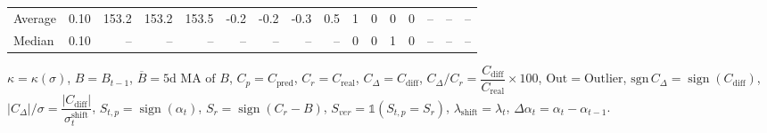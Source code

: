\begin{threeparttable}
{\begin{tabular}{lrrrrrrrrrrrrrrr}
Average &     0.10 & 153.2 & 153.2 & 153.5 &       -0.2 &           -0.2 &                     -0.3 &                 0.5 &              1 &         0 &     0 &         0 &         -- &        -- &             -- \\
 Median &     0.10 &    -- &    -- &    -- &         -- &             -- &                       -- &                  -- &              0 &         0 &     1 &         0 &         -- &        -- &             -- \\
\bottomrule
\end{tabular}
}
\begin{tablenotes}\footnotesize
\item $\kappa=\kappa(\sigma)$, $B=B_{t-1}$, $\overline{B}=\text{5d MA of }B$, $C_p=C_{\text{pred}}$, $C_r=C_{\text{real}}$, $C_\Delta=C_{\text{diff}}$, $C_\Delta/C_r=\dfrac{C_{\text{diff}}}{C_{\text{real}}}\times100$, $\mathrm{Out}=\text{Outlier}$, $\mathrm{sgn}\,C_\Delta=\operatorname{sign}(C_{\text{diff}})$, $|C_\Delta|/\sigma=\dfrac{|C_{\text{diff}}|}{\sigma_t^{\text{shift}}}$, $S_{t,p}=\operatorname{sign}(\alpha_t)$, $S_r=\operatorname{sign}(C_r - B)$, $S_{ver}=\mathbb{1}(S_{t,p}=S_r)$, $\lambda_{\text{shift}}=\lambda_t$, $\Delta\alpha_t=\alpha_t-\alpha_{t-1}$.\end{tablenotes}
\end{threeparttable}
\endgroup

